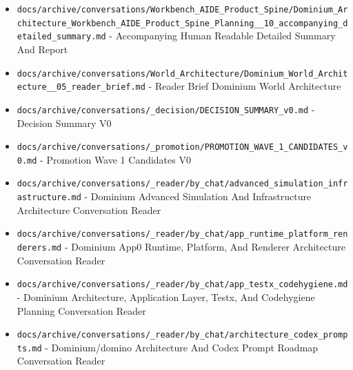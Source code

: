 \documentclass[10.5pt,a4paper,openany]{book}
\begin{document}
\begin{itemize}
\item \texttt{docs/\allowbreak{}archive/\allowbreak{}conversations/\allowbreak{}Workbench\_\allowbreak{}AIDE\_\allowbreak{}Product\_\allowbreak{}Spine/\allowbreak{}Dominium\_\allowbreak{}Architecture\_\allowbreak{}Workbench\_\allowbreak{}AIDE\_\allowbreak{}Product\_\allowbreak{}Spine\_\allowbreak{}Planning\_\allowbreak{}\_\allowbreak{}10\_\allowbreak{}accompanying\_\allowbreak{}detailed\_\allowbreak{}summary.\allowbreak{}md} -\allowbreak{} Accompanying Human Readable Detailed Summary And Report
\item \texttt{docs/\allowbreak{}archive/\allowbreak{}conversations/\allowbreak{}World\_\allowbreak{}Architecture/\allowbreak{}Dominium\_\allowbreak{}World\_\allowbreak{}Architecture\_\allowbreak{}\_\allowbreak{}05\_\allowbreak{}reader\_\allowbreak{}brief.\allowbreak{}md} -\allowbreak{} Reader Brief Dominium World Architecture
\item \texttt{docs/\allowbreak{}archive/\allowbreak{}conversations/\allowbreak{}\_\allowbreak{}decision/\allowbreak{}DECISION\_\allowbreak{}SUMMARY\_\allowbreak{}v0.\allowbreak{}md} -\allowbreak{} Decision Summary V0
\item \texttt{docs/\allowbreak{}archive/\allowbreak{}conversations/\allowbreak{}\_\allowbreak{}promotion/\allowbreak{}PROMOTION\_\allowbreak{}WAVE\_\allowbreak{}1\_\allowbreak{}CANDIDATES\_\allowbreak{}v0.\allowbreak{}md} -\allowbreak{} Promotion Wave 1 Candidates V0
\item \texttt{docs/\allowbreak{}archive/\allowbreak{}conversations/\allowbreak{}\_\allowbreak{}reader/\allowbreak{}by\_\allowbreak{}chat/\allowbreak{}advanced\_\allowbreak{}simulation\_\allowbreak{}infrastructure.\allowbreak{}md} -\allowbreak{} Dominium Advanced Simulation And Infrastructure Architecture Conversation Reader
\item \texttt{docs/\allowbreak{}archive/\allowbreak{}conversations/\allowbreak{}\_\allowbreak{}reader/\allowbreak{}by\_\allowbreak{}chat/\allowbreak{}app\_\allowbreak{}runtime\_\allowbreak{}platform\_\allowbreak{}renderers.\allowbreak{}md} -\allowbreak{} Dominium App0 Runtime, Platform, And Renderer Architecture Conversation Reader
\item \texttt{docs/\allowbreak{}archive/\allowbreak{}conversations/\allowbreak{}\_\allowbreak{}reader/\allowbreak{}by\_\allowbreak{}chat/\allowbreak{}app\_\allowbreak{}testx\_\allowbreak{}codehygiene.\allowbreak{}md} -\allowbreak{} Dominium Architecture, Application Layer, Testx, And Codehygiene Planning Conversation Reader
\item \texttt{docs/\allowbreak{}archive/\allowbreak{}conversations/\allowbreak{}\_\allowbreak{}reader/\allowbreak{}by\_\allowbreak{}chat/\allowbreak{}architecture\_\allowbreak{}codex\_\allowbreak{}prompts.\allowbreak{}md} -\allowbreak{} Dominium/\allowbreak{}domino Architecture And Codex Prompt Roadmap Conversation Reader

\end{itemize}
\end{document}
